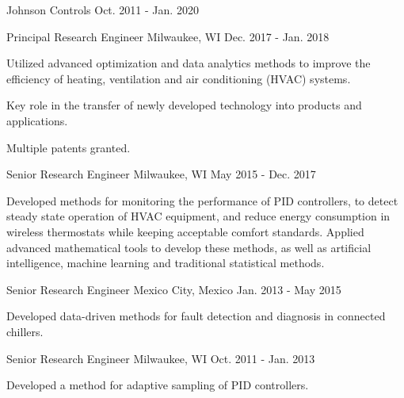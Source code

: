 

\begin{cventries}

\cvmultientry
{Johnson Controls} %
{}
{Oct. 2011 - Jan. 2020} %
{
\cvsubentry
{Principal Research Engineer} %
{Milwaukee, WI} %
{Dec. 2017 - Jan. 2018} %
{
\begin{cvitems} %
\item {Utilized advanced optimization and data analytics methods to improve the efficiency of heating, ventilation and air conditioning (HVAC) systems.}
\item {Key role in the transfer of newly developed technology into products and applications.}
\item {Multiple patents granted.}
\end{cvitems}
}
\cvsubentry
{Senior Research Engineer} %
{Milwaukee, WI} %
{May 2015 - Dec. 2017} %
{
\begin{cvitems} %
\item {Developed methods for monitoring the performance of PID controllers, to detect steady state operation of HVAC equipment, and reduce energy consumption in wireless thermostats while keeping acceptable comfort standards. Applied advanced mathematical tools to develop these methods, as well as artificial intelligence, machine learning and traditional statistical methods.}
\end{cvitems}
}
\cvsubentry
{Senior Research Engineer} %
{Mexico City, Mexico} %
{Jan. 2013 - May 2015} %
{
\begin{cvitems} %
\item {Developed data-driven methods for fault detection and diagnosis in connected chillers.}
\end{cvitems}
}
\cvsubentry
{Senior Research Engineer} %
{Milwaukee, WI} %
{Oct. 2011 - Jan. 2013} %
{
\begin{cvitems} %
\item {Developed a method for adaptive sampling of PID controllers.}
\end{cvitems}
}
}
\end{cventries}
